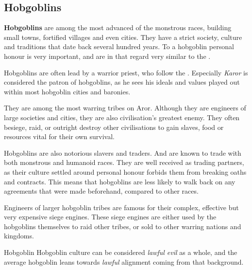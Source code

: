 \subsection{Hobgoblins}
\label{sec:Hobgoblins}

\textbf{Hobgoblins} are among the most advanced of the monstrous races,
building small towns, fortified villages and even cities. They have a strict
society, culture and traditions that date back several hundred years.
To a hobgoblin personal honour is very important, and are in that regard very
similar to the .

Hobgoblins are often lead by a warrior priest, who follow the
. Especially \emph{Karor} is considered the patron of
hobgoblins, as he sees his ideals and values played out within most hobgoblin
cities and baronies.

They are among the most warring tribes on Aror. Although they are engineers of
large societies and cities, they are also civilisation's greatest enemy. They
often besiege, raid, or outright destroy other civilisations to gain slaves,
food or resources vital for their own survival.

Hobgoblins are also notorious slavers and traders. And are known to trade
with both monstrous and humanoid races. They are well received as trading
partners, as their culture settled around personal honour forbids them from
breaking oaths and contracts. This means that hobgoblins are less likely to
walk back on any agreements that were made beforehand, compared to other races.

Engineers of larger hobgoblin tribes are famous for their complex, effective
but very expensive siege engines. These siege engines are either used by the
hobgoblins themselves to raid other tribes, or sold to other warring nations
and kingdoms.

\begin{35e}{Hobgoblin}
  Hobgoblin culture can be considered \emph{lawful evil} as a whole, and the
  average hobgoblin leans towards \emph{lawful} alignment coming from that
  background.
\end{35e}
